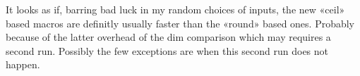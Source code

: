 

%







\bye

It looks as if, barring bad luck in my random choices of inputs,
the new «ceil» based macros are definitly usually faster than
the «round» based ones. Probably because of the latter
overhead of the dim comparison which may requires a second run.
Possibly the few exceptions are when this second run does not
happen.
